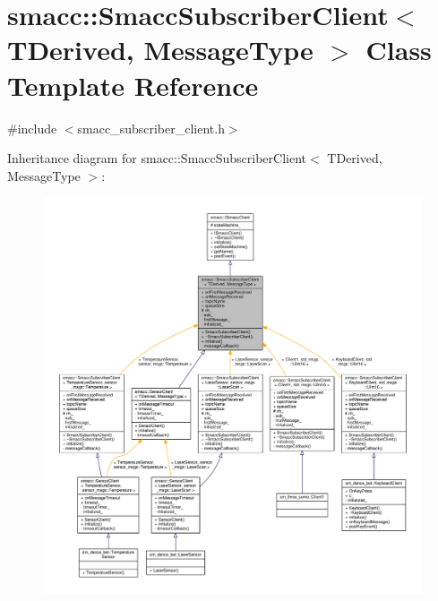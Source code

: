\hypertarget{classsmacc_1_1SmaccSubscriberClient}{}\section{smacc\+:\+:Smacc\+Subscriber\+Client$<$ T\+Derived, Message\+Type $>$ Class Template Reference}
\label{classsmacc_1_1SmaccSubscriberClient}


{\ttfamily \#include $<$smacc\+\_\+subscriber\+\_\+client.\+h$>$}



Inheritance diagram for smacc\+:\+:Smacc\+Subscriber\+Client$<$ T\+Derived, Message\+Type $>$\+:
\nopagebreak
\begin{figure}[H]
\begin{center}
\leavevmode
\includegraphics[width=350pt]{classsmacc_1_1SmaccSubscriberClient__inherit__graph}
\end{center}
\end{figure}


